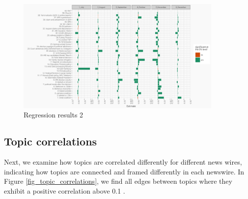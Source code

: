 \documentclass[12pt,a4paper,notitlepage]{article}
\begin{document}
\begin{figure}[H]
	\caption{Regression results 2}
		\begin{center}
			\includegraphics[width=0.9\textwidth,keepaspectratio]{../figs/estimates_month.png}
		\end{center}
	\label{fig_estimateEffects2}
\end{figure}


\subsection{Topic correlations}

Next, we examine how topics are correlated differently for different news wires, indicating how topics are connected and framed differently in each newswire. In Figure \ref{fig_topic_correlations}, we find all edges between topics where they exhibit a positive correlation above 0.1 \citep{roberts_model_2016}.
\end{document}
